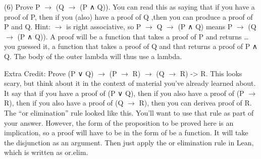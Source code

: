 \documentclass[letterpaper,10pt,english]{sphinxmanual}
\begin{document}
(6)
Prove P \(\rightarrow\) (Q \(\rightarrow\) (P ∧ Q)). You can read this as saying
that if you have a proof of P, then if you (also) have
a proof of Q ,then you can produce a proof of P and Q.
Hint: \(\rightarrow\) is right associative, so P \(\rightarrow\) Q \(\rightarrow\) (P ∧ Q) means
P \(\rightarrow\) (Q \(\rightarrow\) (P ∧ Q)). A proof will be a function that
takes a proof of P and returns … you guessed it, a
function that takes a proof of Q and that returns a
proof of P ∧ Q. The body of the outer lambda will thus
use a lambda.

\begin{sphinxVerbatim}[commandchars=\\\{\}]
         
           
\end{sphinxVerbatim}

\begin{sphinxVerbatim}[commandchars=\\\{\}]
        
    
\end{sphinxVerbatim}

Extra Credit: Prove (P ∨ Q) \(\rightarrow\) (P \(\rightarrow\) R) \(\rightarrow\) (Q \(\rightarrow\) R) -\textgreater{} R. This looks
scary, but think about it in the context of material you’ve already
learned about. It say that if you have a proof of (P ∨ Q), then if you
also have a proof of (P \(\rightarrow\) R), then if you also have a proof of (Q \(\rightarrow\)
R), then you can derivea proof of R. The “or elimination” rule looked
like this. You’ll want to use that rule as part of your
answer. However, the form of the proposition to be proved here is an
implication, so a proof will have to be in the form of be a
function. It will take the disjunction as an argument. Then just apply
the or elimination rule in Lean, which is written as or.elim.

\begin{sphinxVerbatim}[commandchars=\\\{\}]
               
           
\end{sphinxVerbatim}
\end{document}
